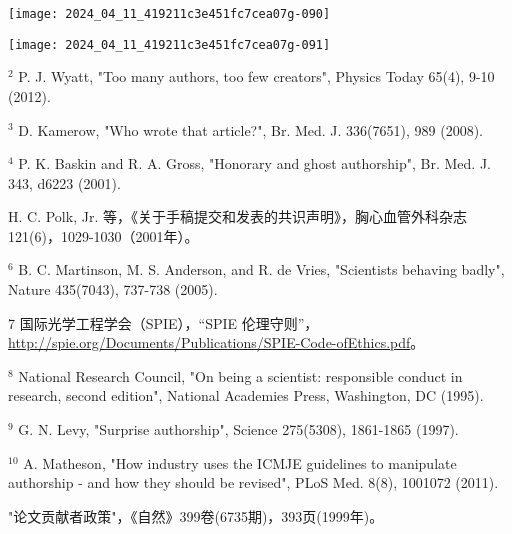 \begin{center}
\texttt{[image: 2024\_04\_11\_419211c3e451fc7cea07g-090]}
\end{center}
\begin{center}
\texttt{[image: 2024\_04\_11\_419211c3e451fc7cea07g-091]}
\end{center}

${ }^{2}$ P. J. Wyatt, "Too many authors, too few creators", Physics Today 65(4), 9-10 (2012).

${ }^{3}$ D. Kamerow, "Who wrote that article?", Br. Med. J. 336(7651), 989 (2008).

${ }^{4}$ P. K. Baskin and R. A. Gross, "Honorary and ghost authorship", Br. Med. J. 343, d6223 (2001).

H. C. Polk, Jr. 等，《关于手稿提交和发表的共识声明》，胸心血管外科杂志121(6)，1029-1030（2001年）。

${ }^{6}$ B. C. Martinson, M. S. Anderson, and R. de Vries, "Scientists behaving badly", Nature 435(7043), 737-738 (2005).

7 国际光学工程学会（SPIE），“SPIE 伦理守则”，\href{http://spie.org/Documents/Publications/SPIE-Code-ofEthics.pdf}{http://spie.org/Documents/Publications/SPIE-Code-ofEthics.pdf}。

${ }^{8}$ National Research Council, "On being a scientist: responsible conduct in research, second edition", National Academies Press, Washington, DC (1995).

${ }^{9}$ G. N. Levy, "Surprise authorship", Science 275(5308), 1861-1865 (1997).

${ }^{10}$ A. Matheson, "How industry uses the ICMJE guidelines to manipulate authorship - and how they should be revised", PLoS Med. 8(8), 1001072 (2011).

"论文贡献者政策"，《自然》399卷(6735期)，393页(1999年)。

